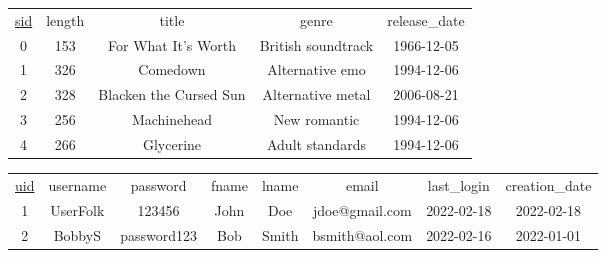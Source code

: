 \documentclass[12pt]{article}
\begin{document}
    \begin{center}
        \begin{tabular}{ |c|c|c|c|c| }
            \hline
            \rowcolor{tablegrey} \multicolumn{5}{|c|}{Song} \\
            \hline
            \underline{sid} & length & title & genre & release\_date \\
            \hline
            0 & 153 & For What It's Worth & British soundtrack & 1966-12-05 \\
            \hline
            1 & 326 & Comedown & Alternative emo & 1994-12-06 \\
            \hline
            2 & 328 & Blacken the Cursed Sun & Alternative metal & 2006-08-21 \\
            \hline
            3 & 256 & Machinehead & New romantic & 1994-12-06 \\
            \hline
            4 & 266 & Glycerine & Adult standards & 1994-12-06 \\
            \hline
        \end{tabular}
    \end{center}




    \scriptsize
    \begin{center}
        \begin{tabular}{ |c|c|c|c|c|c|c|c| }
            \hline
            \rowcolor{tablegrey} \multicolumn{8}{|c|}{User} \\
            \hline
            \underline{uid} & username & password & fname & lname & email & last\_login & creation\_date \\
            \hline
            1 & UserFolk & 123456 & John & Doe & jdoe@gmail.com & 2022-02-18 & 2022-02-18\\
            \hline
            2 & BobbyS & password123 & Bob & Smith & bsmith@aol.com & 2022-02-16 & 2022-01-01 \\
            \hline
        \end{tabular}
    \end{center}
    \normalsize
\end{document}
